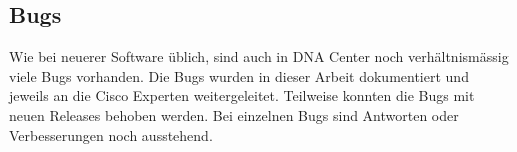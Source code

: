 \subsection{Bugs}
Wie bei neuerer Software üblich, sind auch in DNA Center noch verhältnismässig viele Bugs vorhanden. Die Bugs wurden in dieser Arbeit dokumentiert und jeweils an die Cisco Experten weitergeleitet. Teilweise konnten die Bugs mit neuen Releases behoben werden. Bei einzelnen Bugs sind Antworten oder Verbesserungen noch ausstehend. 



